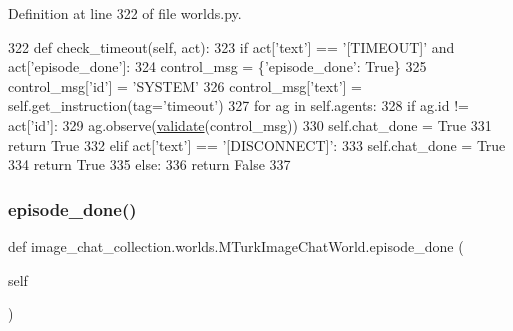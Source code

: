 Definition at line 322 of file worlds.\+py.


\begin{DoxyCode}
322     \textcolor{keyword}{def }check\_timeout(self, act):
323         \textcolor{keywordflow}{if} act[\textcolor{stringliteral}{'text'}] == \textcolor{stringliteral}{'[TIMEOUT]'} \textcolor{keywordflow}{and} act[\textcolor{stringliteral}{'episode\_done'}]:
324             control\_msg = \{\textcolor{stringliteral}{'episode\_done'}: \textcolor{keyword}{True}\}
325             control\_msg[\textcolor{stringliteral}{'id'}] = \textcolor{stringliteral}{'SYSTEM'}
326             control\_msg[\textcolor{stringliteral}{'text'}] = self.get\_instruction(tag=\textcolor{stringliteral}{'timeout'})
327             \textcolor{keywordflow}{for} ag \textcolor{keywordflow}{in} self.agents:
328                 \textcolor{keywordflow}{if} ag.id != act[\textcolor{stringliteral}{'id'}]:
329                     ag.observe(\hyperlink{namespaceparlai_1_1core_1_1worlds_afc3fad603b7bce41dbdc9cdc04a9c794}{validate}(control\_msg))
330             self.chat\_done = \textcolor{keyword}{True}
331             \textcolor{keywordflow}{return} \textcolor{keyword}{True}
332         \textcolor{keywordflow}{elif} act[\textcolor{stringliteral}{'text'}] == \textcolor{stringliteral}{'[DISCONNECT]'}:
333             self.chat\_done = \textcolor{keyword}{True}
334             \textcolor{keywordflow}{return} \textcolor{keyword}{True}
335         \textcolor{keywordflow}{else}:
336             \textcolor{keywordflow}{return} \textcolor{keyword}{False}
337 
\end{DoxyCode}
\mbox{\label{classimage__chat__collection_1_1worlds_1_1MTurkImageChatWorld_a27c215716de1649559eca384ed71d0f8}} 
\subsubsection{\texorpdfstring{episode\+\_\+done()}{episode\_done()}}
{\footnotesize\ttfamily def image\+\_\+chat\+\_\+collection.\+worlds.\+M\+Turk\+Image\+Chat\+World.\+episode\+\_\+done (\begin{DoxyParamCaption}\item[{}]{self }\end{DoxyParamCaption})}



